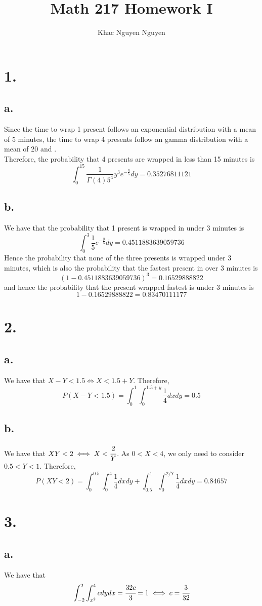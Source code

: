 \documentclass[11pt]{article}
\title{\textbf{Math 217 Homework I}}
\author{Khac Nguyen Nguyen}
\date{}
\begin{document}
\section*{1.}
\subsection*{a.}
Since the time to wrap 1 present follows an exponential distribution with a mean of 5 minutes,
the time to wrap 4 presents follow an gamma distribution with a mean of 20 and . \\
Therefore, the probability that 4 presents are wrapped in less than 15 minutes is
\[
\int_0^{15} \frac{1}{\Gamma(4)5^4}y^3e^{-\frac{y}{5}}dy = 0.35276811121
\]
\subsection*{b.}
We have that the probability that 1 present is wrapped in under 3 minutes is
\[
\int_0^3 \frac{1}{5}e^{-\frac{y}{5}} dy = 0.4511883639059736
\]
Hence the probability that none of the three presents is wrapped under 3 minutes, 
    which is also the probability that the fastest present in over 3 minutes is
\[
    (1-0.4511883639059736)^3 = 0.16529888822
\]
    and hence the probability that the present wrapped fastest is under 3 minutes is
\[
    1 - 0.16529888822 = 0.83470111177
\]
\pagebreak
\section*{2.}
\subsection*{a.}
We have that $X-Y< 1.5 \iff X < 1.5 +Y$. Therefore, 
\[
    P(X-Y<1.5) = \int_0^1 \int_0^{1.5 + y} \frac{1}{4}dx dy = 0.5    
\]
\subsection*{b.}
We have that $XY < 2 \iff X < \cfrac{2}{Y}$. As $0<X<4$, we only need to consider $0.5<Y<1$. Therefore, 
\[
    P(XY < 2) = \int_0^{0.5} \int_0^4 \frac{1}{4} dxdy + \int_{0.5}^1 \int_0^{2/Y} \frac{1}{4} dx dy = 0.84657
\]
\pagebreak
\section*{3.}
\subsection*{a.}
We have that
\[
\int_{-2}^2 \int_{x^2}^4 c dy dx = \cfrac{32c}{3} = 1 \iff c = \cfrac{3}{32}    
\]
\end{document}
